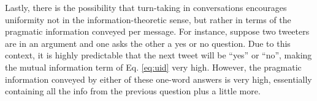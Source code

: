 \documentclass[11pt,letterpaper]{article}
\begin{document}
Lastly, there is the possibility that turn-taking in conversations encourages uniformity not in the information-theoretic sense, but rather in terms of the pragmatic information conveyed per message.  For instance, suppose two tweeters are in an argument and one asks the other a yes or no question.  Due to this context, it is highly predictable that the next tweet will be ``yes'' or ``no'', making the mutual information term of Eq. \ref{eq:uid} very high.  However, the pragmatic information conveyed by either of these one-word answers is very high, essentially containing all the info from the previous question plus a little more.

%

\newpage
~
\newpage


\end{document}
